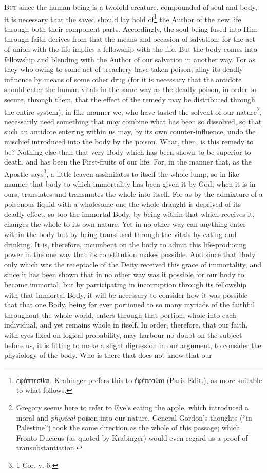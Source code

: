 
\textsc{But} since the human being is a twofold creature, compounded of soul and body, it is necessary that the saved should lay hold of\footnote{\textgreek{ἐφάπτεσθαι}. Krabinger prefers this to \textgreek{ἐφέπεσθαι} (Paris Edit.), as more suitable to what follows.} the Author of the new life through both their component parts. Accordingly, the soul being fused into Him through faith derives from that the means and occasion of salvation; for the act of union with the life implies a fellowship with the life. But the body comes into fellowship and blending with the Author of our salvation in another way. For as they who owing to some act of treachery have taken poison, allay its deadly influence by means of some other drug (for it is necessary that the antidote should enter the human vitals in the same way as the deadly poison, in order to secure, through them, that the effect of the remedy may be distributed through the entire system), in like manner we, who have tasted the solvent of our nature\footnote{Gregory seems here to refer to Eve’s eating the apple, which introduced a moral and \emph{physical} poison into our nature. General Gordon’s thoughts (“in Palestine”) took the same direction as the whole of this passage; which Fronto Ducæus (as quoted by Krabinger) would even regard as a proof of transubstantiation.}, necessarily need something that may combine what has been so dissolved, so that such an antidote entering within us may, by its own counter-influence, undo the mischief introduced into the body by the poison. What, then, is this remedy to be? Nothing else than that very Body which has been shown to be superior to death, and has been the First-fruits of our life. For, in the manner that, as the Apostle says\footnote{1 Cor. v. 6.}, a little leaven assimilates to itself the whole lump, so in like manner that body to which immortality has been given it by God, when it is in ours, translates and transmutes the whole into itself. For as by the admixture of a poisonous liquid with a wholesome one the whole draught is deprived of its deadly effect, so too the immortal Body, by being within that which receives it, changes the whole to its own nature. Yet in no other way can anything enter within the body but by being transfused through the vitals by eating and drinking. It is, therefore, incumbent on the body to admit this life-producing power in the one way that its constitution makes possible. And since that Body only which was the receptacle of the Deity received this grace of immortality, and since it has been shown that in no other way was it possible for our body to become immortal, but by participating in incorruption through its fellowship with that immortal Body, it will be necessary to consider how it was possible that that one Body, being for ever portioned to so many myriads of the faithful throughout the whole world, enters through that portion, whole into each individual, and yet remains whole in itself. In order, therefore, that our faith, with eyes fixed on logical probability, may harbour no doubt on the subject before us, it is fitting to make a slight digression in our argument, to consider the physiology of the body. Who is there that does not know that our 